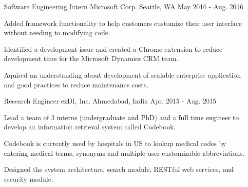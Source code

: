\begin{cventries}
  \cventry
    {Software Engineering Intern} %
    {Microsoft Corp.} %
    {Seattle, WA} %
    {May 2016 - Aug. 2016} %
    {
      \begin{cvitems} %
        \item Added framework functionality to help customers customize their user interface without needing to modifying code.
        \item Identified a development issue and created a Chrome extension to reduce development time for the Microsoft Dynamics CRM team.
        \item Aquired an understanding about development of scalable enterprise application and good practices to reduce maintenance costs.
      \end{cvitems}
    }

  \cventry
    {Research Engineer} %
    {ezDI, Inc.} %
    {Ahmedabad, India} %
    {Apr. 2015 - Aug. 2015} %
    {
      \begin{cvitems} %
      	\item Lead a team of 3 interns (undergraduate and PhD) and a full time engineer to develop an information retrieval system called Codebook.
      	\item Codebook is currently used by hospitals in US to lookup medical codes by entering medical terms, synonyms and multiple user customizable abbreviations.
      	\item Designed the system architecture, search module, RESTful web services, and security module.
      \end{cvitems}
    }

\end{cventries}
